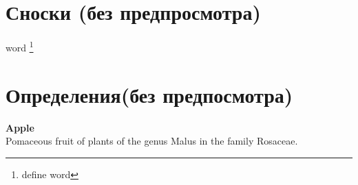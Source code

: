 \section{\textbf{Сноски (без предпросмотра)}}

word \footnote{define word}
\section{\textbf{Определения(без предпосмотра)}}


\textbf{Apple}\\
\hspace{20pt}Pomaceous fruit of plants of the genus Malus in the family Rosaceae.




    